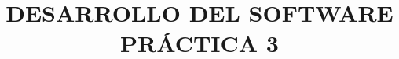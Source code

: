 \documentclass{article}
\begin{document}
\title{
	\textbf{DESARROLLO DEL SOFTWARE} \\ 
	PRÁCTICA 3}


\maketitle
\end{document}
